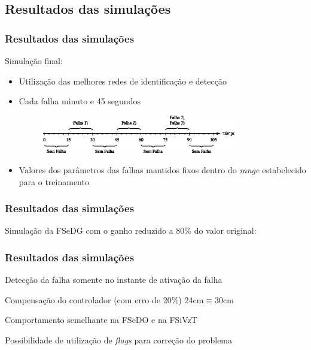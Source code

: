 \documentclass{beamer}
\begin{document}
\subsection{Resultados das simulações}

\begin{frame}
    \frametitle{Resultados das simulações}

Simulação final:    

\begin{itemize}
    \item Utilização das melhores redes de identificação e detecção
    \item Cada falha  minuto e 45 segundos
\begin{figure}[htb]
\centering
    \includegraphics[width=0.8\textwidth]{imgs/resultados/eps/intervalos}
\end{figure}
    \item Valores dos parâmetros das falhas \implica mantidos fixos dentro do
          {\it range} estabelecido para o treinamento
\end{itemize}
\end{frame}

\begin{frame}
    \frametitle{Resultados das simulações}

\footnotesize Simulação da FSeDG com o ganho reduzido a 80\% do valor original:

\begin{figure}[htb]
\footnotesize
\centering
\scalebox{0.68}{}
\end{figure}
    
\end{frame}

\begin{frame}
    \frametitle{Resultados das simulações}

    Detecção da falha somente no instante de ativação da falha

    \vspace{0.25cm}

    Compensação do controlador (com erro de 20\%) \implica $24 \text{cm} \equiv
    30 \text{cm}$

    \vspace{0.25cm}

    Comportamento semelhante na FSeDO e na FSiVzT

    \vspace{0.25cm}

    Possibilidade de utilização de {\it flags} para correção do problema

\end{frame}
\end{document}
